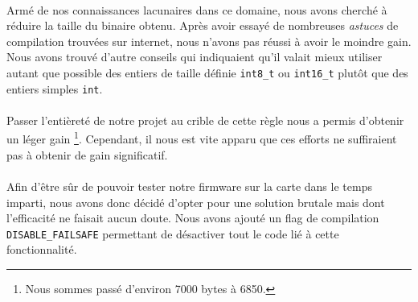 \paragraph{}
Armé de nos connaissances lacunaires dans ce domaine, nous avons cherché à
réduire la taille du binaire obtenu. Après avoir essayé de nombreuses
{\em astuces} de compilation trouvées sur internet, nous n'avons pas réussi à
avoir le moindre gain. Nous avons trouvé d'autre conseils qui indiquaient qu'il
valait mieux utiliser autant que possible des entiers de taille définie
\verb!int8_t! ou \verb!int16_t! plutôt que des entiers simples \verb!int!.

\paragraph{}
Passer l'entièreté de notre projet au crible de cette règle nous a permis
d'obtenir un léger gain
          \footnote{Nous sommes passé d'environ 7000 bytes à 6850.}.
Cependant, il nous est vite apparu que ces efforts ne suffiraient pas à obtenir
de gain significatif.

\paragraph{}
Afin d'être sûr de pouvoir tester notre firmware sur la carte dans le temps
imparti, nous avons donc décidé d'opter pour une solution brutale mais dont
l'efficacité ne faisait aucun doute. Nous avons ajouté un flag de compilation
\verb!DISABLE_FAILSAFE! permettant de désactiver tout le code lié à cette
fonctionnalité.
